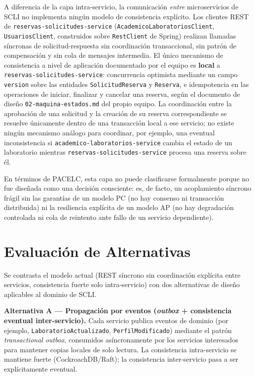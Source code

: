 \documentclass[12pt,letterpaper]{article}
\begin{document}
A diferencia de la capa intra-servicio, la comunicaci\'on \emph{entre}
microservicios de SCLI no implementa ning\'un modelo de consistencia
expl\'icito. Los clientes REST de \texttt{reservas-solicitudes-service}
(\texttt{AcademicoLaboratoriosClient}, \texttt{UsuariosClient}, construidos
sobre \texttt{RestClient} de Spring) realizan llamadas s\'incronas de
solicitud-respuesta sin coordinaci\'on transaccional, sin patr\'on de
compensaci\'on y sin cola de mensajes intermedia. El \'unico mecanismo de
consistencia a nivel de aplicaci\'on documentado por el equipo es
\textbf{local} a \texttt{reservas-solicitudes-service}: concurrencia
optimista mediante un campo \texttt{version} sobre las entidades
\texttt{SolicitudReserva} y \texttt{Reserva}, e idempotencia en las
operaciones de iniciar, finalizar y cancelar una reserva, seg\'un el
documento de dise\~no \texttt{02-maquina-estados.md} del propio equipo. La
coordinaci\'on entre la aprobaci\'on de una solicitud y la creaci\'on de su
reserva correspondiente se resuelve \'unicamente dentro de una transacci\'on
local a ese servicio; no existe ning\'un mecanismo an\'alogo para
coordinar, por ejemplo, una eventual inconsistencia si
\texttt{academico-laboratorios-service} cambia el estado de un laboratorio
mientras \texttt{reservas-solicitudes-service} procesa una reserva sobre
\'el.

En t\'erminos de PACELC, esta capa no puede clasificarse formalmente
porque no fue dise\~nada como una decisi\'on consciente: es, de facto, un
acoplamiento s\'incrono fr\'agil sin las garant\'ias de un modelo PC (no
hay consenso ni transacci\'on distribuida) ni la resiliencia expl\'icita de
un modelo AP (no hay degradaci\'on controlada ni cola de reintento ante
fallo de un servicio dependiente).

\section{Evaluaci\'on de Alternativas}

Se contrasta el modelo actual (REST s\'incrono sin coordinaci\'on expl\'icita
entre servicios, consistencia fuerte solo intra-servicio) con dos
alternativas de dise\~no aplicables al dominio de SCLI.

\textbf{Alternativa A --- Propagaci\'on por eventos (\emph{outbox} +
consistencia eventual inter-servicio).} Cada servicio publica eventos de
dominio (por ejemplo, \texttt{LaboratorioActualizado},
\texttt{PerfilModificado}) mediante el patr\'on \emph{transactional
outbox}, consumidos as\'incronamente por los servicios interesados para
mantener copias locales de solo lectura. La consistencia intra-servicio se
mantiene fuerte (CockroachDB/Raft); la consistencia inter-servicio pasa a
ser expl\'icitamente eventual.
\end{document}
